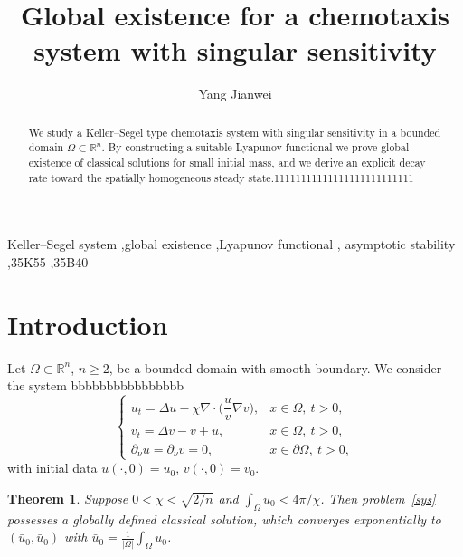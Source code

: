 \documentclass[preprint,12pt]{elsarticle}
\newtheorem{theorem}{Theorem}[section]
\theoremstyle{definition}
\newcommand{\R}{\mathbb{R}}
\newcommand{\Om}{\Omega}
\begin{document}
\begin{frontmatter}

\title{Global existence for a chemotaxis system with singular sensitivity}

\author[1]{Yang Jianwei}
\address[1]{School of Mathematics and Statistics,
North China University of Water Resources and Electric Power,
Zhengzhou 450046, P.R. China}

\begin{abstract}
We study a Keller--Segel type chemotaxis system with singular sensitivity
in a bounded domain $\Om\subset\R^n$. By constructing a suitable
Lyapunov functional we prove global existence of classical solutions
for small initial mass, and we derive an explicit decay rate toward
the spatially homogeneous steady state.11111111111111111111111111
\end{abstract}

\begin{keyword}
Keller--Segel system \sep global existence \sep Lyapunov functional \sep
asymptotic stability \sep 35K55 \sep 35B40
\end{keyword}

\end{frontmatter}

\section{Introduction}\label{s:intro}

Let $\Om\subset\R^n$, $n\ge2$, be a bounded domain with smooth boundary.
We consider the system bbbbbbbbbbbbbbbb
\begin{equation}\label{sys}
  \begin{cases}
    u_t = \Delta u - \chi\nabla\cdot\bigl(\dfrac{u}{v}\nabla v\bigr), & x\in\Om,\ t>0,\\[6pt]
    v_t = \Delta v - v + u, & x\in\Om,\ t>0,\\[4pt]
    \partial_\nu u = \partial_\nu v = 0, & x\in\partial\Om,\ t>0,
  \end{cases}
\end{equation}
with initial data $u(\cdot,0)=u_0$, $v(\cdot,0)=v_0$.

\begin{theorem}\label{thm:main}
Suppose $0<\chi<\sqrt{2/n}$ and $\int_\Om u_0<4\pi/\chi$. Then
problem~\eqref{sys} possesses a globally defined classical solution,
which converges exponentially to $(\bar u_0,\bar u_0)$ with
$\bar u_0=\frac{1}{|\Om|}\int_\Om u_0$.
\end{theorem}
\end{document}
